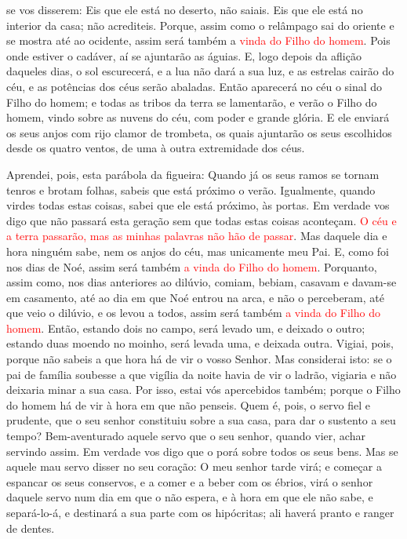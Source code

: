 se vos disserem: Eis que ele está no deserto, não saiais. Eis que
ele está no interior da casa; não acrediteis. Porque, assim
como o relâmpago sai do oriente e se mostra até ao ocidente, assim
será também a \textcolor{red}{vinda do Filho do homem}. Pois onde
estiver o cadáver, aí se ajuntarão as águias. E, logo depois
da aflição daqueles dias, o sol escurecerá, e a lua não dará a sua
luz, e as estrelas cairão do céu, e as potências dos céus serão
abaladas. Então aparecerá no céu o sinal do Filho do homem; e
todas as tribos da terra se lamentarão, e verão o Filho do homem,
vindo sobre as nuvens do céu, com poder e grande glória. E
ele enviará os seus anjos com rijo clamor de trombeta, os quais
ajuntarão os seus escolhidos desde os quatro ventos, de uma à outra
extremidade dos céus.

Aprendei, pois, esta parábola da figueira: Quando já os seus
ramos se tornam tenros e brotam folhas, sabeis que está próximo o
verão. Igualmente, quando virdes todas estas coisas, sabei
que ele está próximo, às portas. Em verdade vos digo que não
passará esta geração sem que todas estas coisas aconteçam.
\textcolor{red}{O céu e a terra passarão, mas as minhas palavras não
hão de passar}. Mas daquele dia e hora ninguém sabe, nem os
anjos do céu, mas unicamente meu Pai. E, como foi nos dias de
Noé, assim será também \textcolor{red}{a vinda do Filho do homem}.
Porquanto, assim como, nos dias anteriores ao dilúvio,
comiam, bebiam, casavam e davam-se em casamento, até ao dia em que
Noé entrou na arca, e não o perceberam, até que veio o
dilúvio, e os levou a todos, assim será também \textcolor{red}{a vinda do
Filho do homem}. Então, estando dois no campo, será levado
um, e deixado o outro; estando duas moendo no moinho, será
levada uma, e deixada outra. Vigiai, pois, porque não sabeis
a que hora há de vir o vosso Senhor. Mas considerai isto: se
o pai de família soubesse a que vigília da noite havia de vir o
ladrão, vigiaria e não deixaria minar a sua casa. Por isso,
estai vós apercebidos também; porque o Filho do homem há de vir à
hora em que não penseis. Quem é, pois, o servo fiel e
prudente, que o seu senhor constituiu sobre a sua casa, para dar o
sustento a seu tempo? Bem-aventurado aquele servo que o seu
senhor, quando vier, achar servindo assim. Em verdade vos
digo que o porá sobre todos os seus bens. Mas se aquele mau
servo disser no seu coração: O meu senhor tarde virá; e
começar a espancar os seus conservos, e a comer e a beber com os
ébrios, virá o senhor daquele servo num dia em que o não
espera, e à hora em que ele não sabe, e separá-lo-á, e
destinará a sua parte com os hipócritas; ali haverá pranto e ranger
de dentes.

